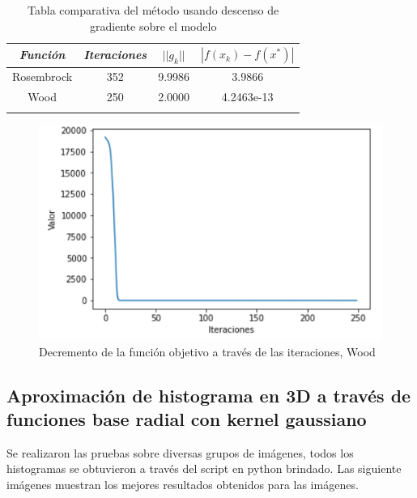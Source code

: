 \documentclass[conference]{IEEEtran}
\begin{document}
\begin{table}[htbp]
    \caption{Tabla comparativa del método usando descenso de gradiente sobre el modelo}
    \begin{center}
        \begin{tabular}{|c|c|c|c|}
            \hline
			\textbf{\textit{Función}}& \textbf{\textit{Iteraciones}}& \textbf{\textit{$||g_k||$}}& \textbf{\textit{$|f(x_k) - f(x^*)|$}} \\

            \hline
            Rosembrock& 352 & 9.9986 & 3.9866 \\
            Wood& 250 & 2.0000 & 4.2463e-13 \\
            \hline
            \multicolumn{4}{l}{}
        \end{tabular}
        \label{tab2}
    \end{center}
\end{table}

\begin{figure}[htbp]
    \centerline{\includegraphics[scale=0.4]{e2-1.png}}
    \caption{Decremento de la función objetivo a través de las iteraciones, Wood}
    \label{img-e2-1}
\end{figure}


\subsection{Aproximación de histograma en 3D a través de funciones base radial con kernel gaussiano}

Se realizaron las pruebas sobre diversas grupos de imágenes, todos los histogramas se obtuvieron a
través del script en python brindado. Las siguiente imágenes muestran los mejores resultados
obtenidos para las imágenes.
\end{document}
